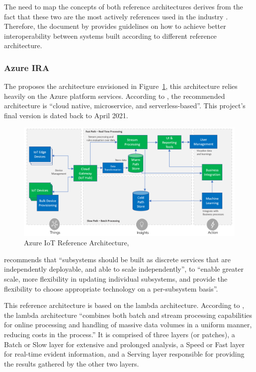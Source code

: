 The need to map the concepts of both reference architectures derives from the fact that these two are the most actively references used in the industry \parencite{DIAS2022100529}. Therefore, the document by \cite{iira-inter-rami} provides guidelines on how to achieve better interoperability between systems built according to different reference architecture. 

\subsubsection{Azure IRA}
\label{subsubsec:stateofart:arch:azure}

The  proposes the architecture envisioned in Figure~\ref{fig:stateofart:arch:azure:ira}, this architecture relies heavily on the Azure platform services. According to \cite{azure-ira}, the recommended architecture is ``cloud native, microservice, and serverless-based''. This project's final version is dated back to April 2021.

\begin{figure}[H]
    \centering
    \includegraphics[scale=0.35]{assets/figures/azure.png}
    \caption[Azure IoT Reference Architecture]{Azure IoT Reference Architecture, \cite{azure-ira}}
    \label{fig:stateofart:arch:azure:ira}
\end{figure}

\cite{azure-ira} recommends that ``subsystems should be built as discrete services that are independently deployable, and able to scale independently'', to ``enable greater scale, more flexibility in updating individual subsystems, and provide the flexibility to choose appropriate technology on a per-subsystem basis''.

This reference architecture is based on the lambda architecture. According to \cite{kiran2015lambda}, the lambda architecture ``combines both batch and stream processing capabilities for online processing and handling of massive data volumes in a uniform manner, reducing costs in the process.''
It is comprised of three layers (or patches), a Batch or Slow layer for extensive and prolonged analysis, a Speed or Fast layer for real-time evident information, and a Serving layer responsible for providing the results gathered by the other two layers.

